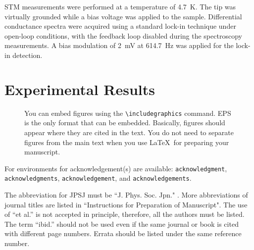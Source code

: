 \documentclass[shortnote,twocolumn]{jpsj3}
\begin{document}
STM measurements were performed at a temperature of \qty{4.7}{\kelvin}.
The tip was virtually grounded while a bias voltage was applied to the sample.
Differential conductance spectra were acquired using a standard lock-in technique under open-loop conditions, with the feedback loop disabled during the spectroscopy measurements.
A bias modulation of \qty{2}{\milli\volt} at \qty{614.7}{\hertz} was applied for the lock-in detection.

\section{Experimental Results}

\begin{figure}
    \caption{
        You can embed figures using the \texttt{\textbackslash includegraphics} command. EPS is the only format that can be embedded. Basically, figures should appear where they are cited in the text. You do not need to separate figures from the main text when you use \LaTeX\ for preparing your manuscript.
    }\label{f1}
\end{figure}

\begin{acknowledgment}
For environments for acknowledgement(s) are available: \verb|acknowledgment|, \verb|acknowledgments|, \verb|acknowledgement|, and \verb|acknowledgements|.
\end{acknowledgment}



\begin{thebibliography}{9}
 The abbreviation for JPSJ must be ``J. Phys. Soc. Jpn." .
 More abbreviations of journal titles are listed in ``Instructions for Preparation of Manuscript".
 The use of ``et al.'' is not accepted in principle, therefore, all the authors must be listed.
 The term ``ibid.'' should not be used even if the same journal or book is cited with different page numbers.
 Errata should be listed under the same reference number.
\end{thebibliography}
\end{document}
